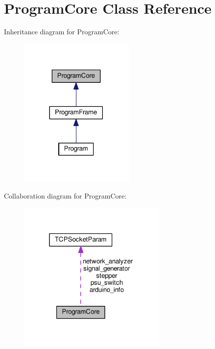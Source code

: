 \hypertarget{class_program_core}{}\section{Program\+Core Class Reference}
\label{class_program_core}


Inheritance diagram for Program\+Core\+:
\nopagebreak
\begin{figure}[H]
\begin{center}
\leavevmode
\includegraphics[width=161pt]{class_program_core__inherit__graph}
\end{center}
\end{figure}


Collaboration diagram for Program\+Core\+:
\nopagebreak
\begin{figure}[H]
\begin{center}
\leavevmode
\includegraphics[width=208pt]{class_program_core__coll__graph}
\end{center}
\end{figure}
